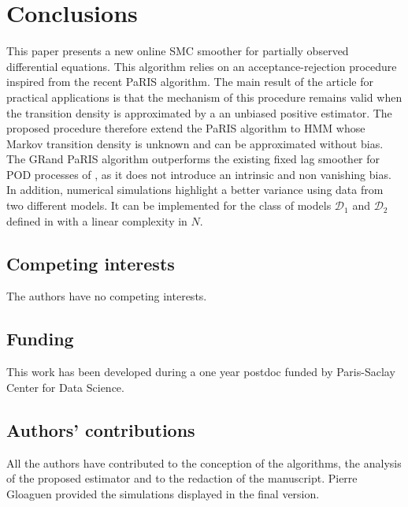 \documentclass[12pt]{article}
\newcommand{\1}{\mathrm{1}}
\begin{document}
\section{Conclusions}
This paper presents a new online SMC smoother for partially observed differential equations.
 This algorithm relies on an acceptance-rejection procedure inspired from the recent PaRIS algorithm.
 The main result of the article for practical applications is that the mechanism of this procedure remains valid when the transition density is approximated by a an unbiased positive estimator.
  The proposed procedure therefore extend the PaRIS algorithm to HMM whose Markov transition density is unknown and can be approximated without bias. The GRand PaRIS algorithm outperforms the existing fixed lag smoother for POD processes of \cite{olsson:strojby:2011}, as it does not introduce an intrinsic and non vanishing bias.
   In addition, numerical simulations highlight a better variance using data from two different models.
   It can be implemented for the class of models $\mathcal{D}_1$ and $\mathcal{D}_2$ defined in \cite{beskos:papaspiliopoulos:roberts:fearnhead:2006} with a linear complexity in $N$. 

\subsection*{Competing interests}
The authors have no competing interests. 

\subsection*{Funding}
This work has been developed during a one year postdoc funded by Paris-Saclay Center for Data Science. 

\subsection*{Authors' contributions}
All the authors have contributed to the conception of the algorithms, the analysis of the proposed estimator and to the redaction of the manuscript.
 Pierre Gloaguen provided the simulations displayed in the final version. 

\appendix
\end{document}
